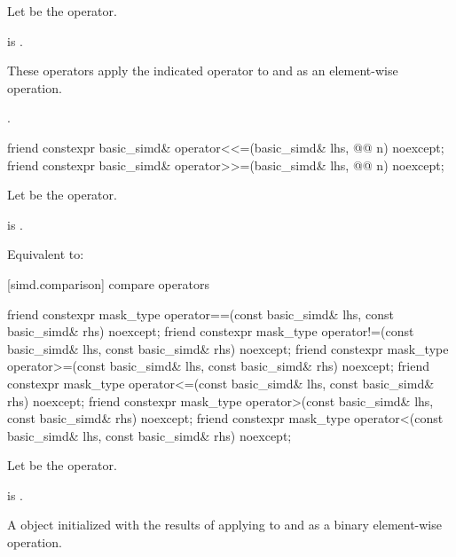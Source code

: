 \begin{itemdescr}
\pnum
Let  be the operator.

\pnum
\constraints
{} is
.

\pnum
\effects
These operators apply the indicated operator to  and  as
an element-wise operation.

\pnum
\returns
{}.
\end{itemdescr}

\begin{itemdecl}
friend constexpr basic_simd& operator<<=(basic_simd& lhs, @@ n) noexcept;
friend constexpr basic_simd& operator>>=(basic_simd& lhs, @@ n) noexcept;
\end{itemdecl}

\begin{itemdescr}
\pnum
Let  be the operator.

\pnum
\constraints
{} is .

\pnum
\effects
Equivalent to: 
\end{itemdescr}

[simd.comparison]{ compare operators}

\begin{itemdecl}
friend constexpr mask_type operator==(const basic_simd& lhs, const basic_simd& rhs) noexcept;
friend constexpr mask_type operator!=(const basic_simd& lhs, const basic_simd& rhs) noexcept;
friend constexpr mask_type operator>=(const basic_simd& lhs, const basic_simd& rhs) noexcept;
friend constexpr mask_type operator<=(const basic_simd& lhs, const basic_simd& rhs) noexcept;
friend constexpr mask_type operator>(const basic_simd& lhs, const basic_simd& rhs) noexcept;
friend constexpr mask_type operator<(const basic_simd& lhs, const basic_simd& rhs) noexcept;
\end{itemdecl}

\begin{itemdescr}
\pnum
Let  be the operator.

\pnum
\constraints
{} is
.

\pnum
\returns
A  object initialized with the results of applying
 to  and  as a binary element-wise
operation.
\end{itemdescr}

